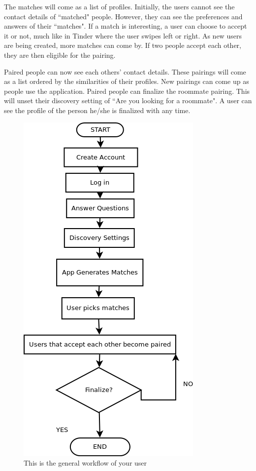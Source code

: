 \documentclass[journal]{./IEEE/IEEEtran}
\begin{document}
The matches will come as a list of profiles. Initially, the users cannot see the contact details of ``matched" people.
However, they can see the preferences and answers of their ``matches". If a match is interesting, a user can choose to
accept it or not, much like in Tinder where the user swipes left or right. As new users are being created, more matches
can come by. If two people accept each other, they are then eligible for the pairing.

Paired people can now see each others' contact details. These pairings will come as a list ordered by the similarities
of their profiles. New pairings can come up as people use the application.  Paired people can finalize the roommate
pairing. This will unset their discovery setting of ``Are you looking for a roommate". A user can see the profile of the
person he/she is finalized with any time.

\begin{figure}[h]
\centering
\includegraphics[scale=0.5]{Workflow}
\caption{This is the general workflow of your user}
\end{figure}
\end{document}

